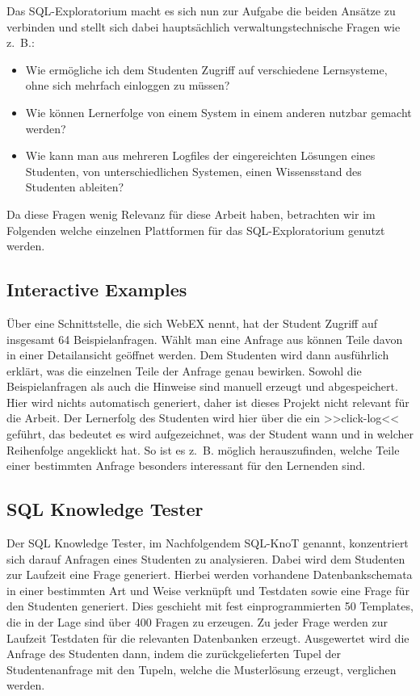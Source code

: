 Das SQL-Exploratorium macht es sich nun zur Aufgabe die beiden Ansätze zu verbinden und stellt sich dabei hauptsächlich verwaltungstechnische Fragen wie \mbox{z. B.}: 

\begin{itemize}
\item Wie ermögliche ich dem Studenten Zugriff auf verschiedene Lernsysteme, ohne sich mehrfach einloggen zu müssen?
\item Wie können Lernerfolge von einem System in einem anderen nutzbar gemacht werden?
\item Wie kann man aus mehreren Logfiles der eingereichten Lösungen eines Studenten, von unterschiedlichen Systemen, einen Wissensstand des Studenten ableiten?
\end{itemize}

Da diese Fragen wenig Relevanz für diese Arbeit haben, betrachten wir im Folgenden welche einzelnen Plattformen für das SQL-Exploratorium genutzt werden.

\subsection{Interactive Examples}

Über eine Schnittstelle, die sich WebEX nennt, hat der Student Zugriff auf insgesamt 64 Beispielanfragen. Wählt man eine Anfrage aus können Teile davon in einer Detailansicht geöffnet werden. Dem Studenten wird dann ausführlich erklärt, was die einzelnen Teile der Anfrage genau bewirken. Sowohl die Beispielanfragen als auch die Hinweise sind manuell erzeugt und abgespeichert. Hier wird nichts automatisch generiert, daher ist dieses Projekt nicht relevant für die Arbeit. Der Lernerfolg des Studenten wird hier über die ein >>click-log<< geführt, das bedeutet es wird aufgezeichnet, was der Student wann und in welcher Reihenfolge angeklickt hat. So ist es \mbox{z. B.} möglich herauszufinden, welche Teile einer bestimmten Anfrage besonders interessant für den Lernenden sind.

\subsection{SQL Knowledge Tester}

Der SQL Knowledge Tester, im Nachfolgendem SQL-KnoT genannt, konzentriert sich darauf Anfragen eines Studenten zu analysieren. Dabei wird dem Studenten zur Laufzeit eine Frage generiert. Hierbei werden vorhandene Datenbankschemata in einer bestimmten Art und Weise verknüpft und Testdaten sowie eine Frage für den Studenten generiert. Dies geschieht mit fest einprogrammierten 50 Templates, die in der Lage sind über 400 Fragen zu erzeugen. Zu jeder Frage werden zur Laufzeit Testdaten für die relevanten Datenbanken erzeugt. Ausgewertet wird die Anfrage des Studenten dann, indem die zurückgelieferten Tupel der Studentenanfrage mit den Tupeln, welche die Musterlösung erzeugt, verglichen werden.

